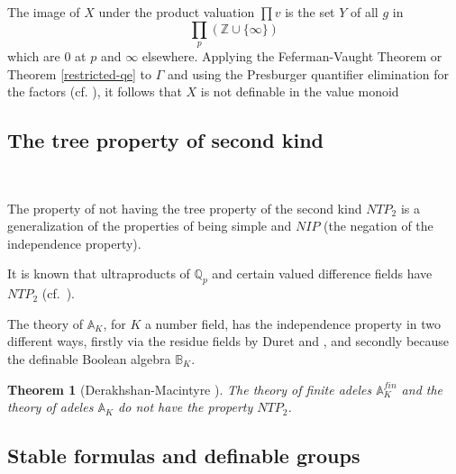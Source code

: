 \documentclass[12pt]{amsart}
\def\A{\mathbb{A}}
\def\B{\mathbb{B}}
\def\Z{\mathbb{Z}}
\def\Q{\mathbb{Q}}
\newtheorem{thm}{Theorem}[section]
\numberwithin{equation}{section}
\begin{document}
The image of $X$ under the product valuation $\prod v$ 
is the set $Y$ of all $g$ in 
$$\prod_p (\Z\cup \{\infty\})$$ which are $0$ at $p$ 
and $\infty$ elsewhere. Applying the Feferman-Vaught Theorem or Theorem \ref{restricted-qe} to $\Gamma$ and using the Presburger quantifier elimination for the factors (cf. \cite{enderton-book}), it follows
that $X$ is not definable in the value monoid

\medskip

\subsection{\bf The tree property of second kind}\label{ssec-tree} 

\

\medskip

The property of not having the tree property of the second kind $NTP_2$ is a generalization of the properties of being 
simple and $NIP$ (the negation of the independence property). 

It is known 
that ultraproducts of $\Q_p$ and certain valued difference fields 
have $NTP_2$ (cf.\ \cite{CH}).  

The theory of $\A_K$, for $K$ a number field, has the independence property in two different ways, firstly via the 
residue fields by Duret \cite{Duret} and \cite{FJ}, and secondly because the definable Boolean algebra $\B_K$. 
\begin{thm}[Derakhshan-Macintyre {\cite{DM-supp}}]\label{thm-ntp} The theory of finite adeles $\A_K^{fin}$ and the theory of adeles 
$\A_K$ do not have the property $NTP_2$.
\end{thm}

\medskip

\subsection{\bf Stable formulas and definable groups}

\

\medskip
\end{document}
